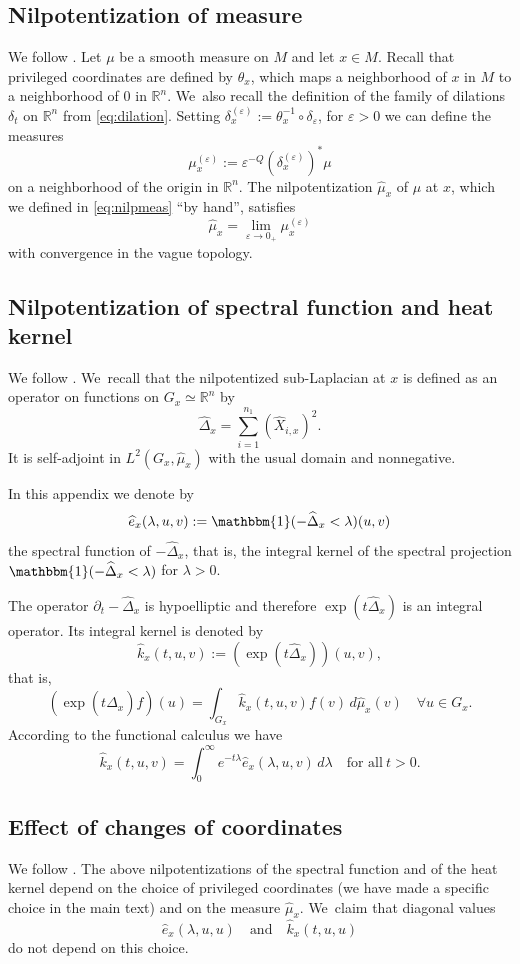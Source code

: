 \documentclass[JEP,XML,SOM,Unicode,published]{cedram}
\theoremstyle{definition}
\let\epsilon\varepsilon
\newcommand{\1}{\mathbbm{1}}
\newcommand{\R}{\mathbb{R}}
\begin{document}
\subsection{Nilpotentization of measure}
We follow \cite[\S A.5.6]{CHT1}. Let $\mu$ be a smooth measure on $M$ and let $x \in M$. Recall that privileged coordinates are defined by $\theta_x$, which maps a neighborhood of $x$ in $M$ to a neighborhood of $0$ in $\R^n$. We~also recall the definition of the family of dilations $\delta_t$ on $\R^n$ from \eqref{eq:dilation}. Setting $\delta_x^{(\epsilon)} := \theta_x^{-1} \circ \delta_\varepsilon$, for $\varepsilon>0$ we can define the measures
\[
\mu_x^{(\varepsilon)} := \varepsilon^{-Q}(\delta_x^{(\varepsilon)})^*\mu
\]
on a neighborhood of the origin in $\R^n$. The nilpotentization $\widehat\mu_x$ of $\mu$ at $x$, which we defined in \eqref{eq:nilpmeas} ``by hand'', satisfies
\[
\widehat{\mu}_x=\lim_{\varepsilon\to 0_+}\mu_x^{(\epsilon)}
\]
with convergence in the vague topology.

\subsection{Nilpotentization of spectral function and heat kernel}
We follow \cite[\S A.8.3]{CHT1}. We~recall that the nilpotentized sub-Laplacian at $x$ is defined as an operator on functions on $G_x\simeq \R^n$ by
\[
\widehat{\Delta}_x= \sum_{i=1}^{n_1} (\widehat{X}_{i,x})^2.
\]
It is self-adjoint in $L^2(G_x,\widehat\mu_x)$ with the usual domain and nonnegative.

In this appendix we denote by
\[
\widehat e_x(\lambda,u,v) := \1(-\widehat\Delta_x <\lambda)(u,v)
\]
the spectral function of $-\widehat\Delta_x$, that is, the integral kernel of the spectral projection $\1(-\widehat\Delta_x<\lambda)$ for $\lambda>0$.

The operator $\partial_t- \widehat{\Delta}_x$ is hypoelliptic and therefore $\exp (t \widehat \Delta_x)$ is an integral operator. Its integral kernel is denoted by
\[
\widehat k_x(t,u,v) := (\exp(t\widehat\Delta_x))(u,v),
\]
that is,
\[
(\exp(t \widehat \Delta_x) f)(u)= \int_{G_x} \widehat k_x(t,u,v) f(v)\,d \widehat{\mu}_x(v)
\quad \forall u\in G_x.
\]
According to the functional calculus we have
\begin{equation}
\label{eq:heatkernelspecfcn}
\widehat k_x(t,u,v) = \int_0^\infty e^{-t\lambda} \widehat e_x(\lambda,u,v)\,d\lambda
\quad\text{for all}\ t>0.
\end{equation}

\subsection{Effect of changes of coordinates}
We follow \cite[2nd part of App.\,A.8.2]{CHT1}. The above nilpotentizations of the spectral function and of the heat kernel depend on the choice of privileged coordinates (we have made a specific choice in the main text) and on the measure $\widehat\mu_x$. We~claim that diagonal values
\[
\widehat e_x(\lambda,u,u)
\quad\text{and}\quad
\widehat k_x(t,u,u)
\]
do not depend on this choice.
\end{document}
